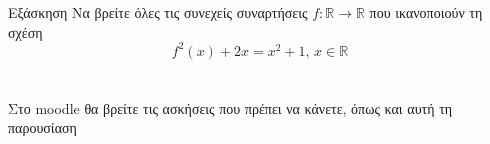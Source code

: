 \documentclass[greek]{beamer}
\begin{document}
\begin{frame}{Εξάσκηση}
 Να βρείτε όλες τις συνεχείς συναρτήσεις $f:\mathbb{R}\to\mathbb{R}$ που ικανοποιούν τη σχέση
 $$f^2(x)+2x=x^2+1 \text{, } x\in\mathbb{R}$$
\end{frame}

\section{}
\begin{frame}
 Στο moodle θα βρείτε τις ασκήσεις που πρέπει να κάνετε, όπως και αυτή τη παρουσίαση
\end{frame}
\end{document}
